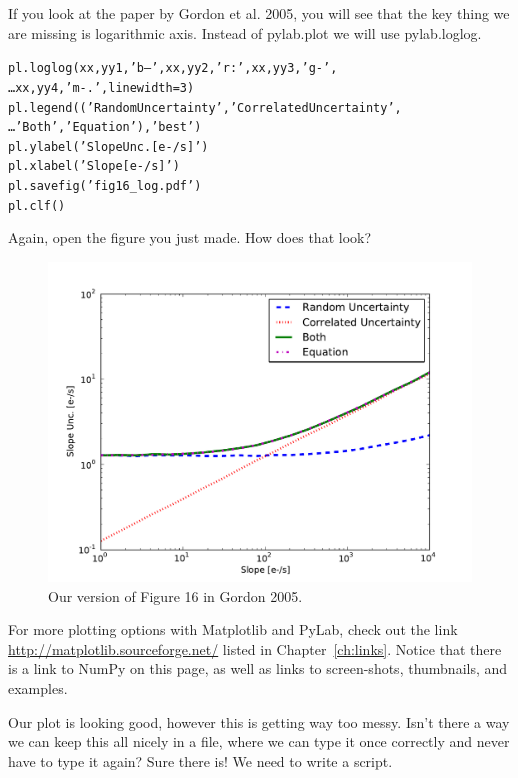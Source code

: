 If you look at the paper by
Gordon et al. 2005, you will see that the key thing we are missing is
logarithmic axis.  Instead of {\sf \small pylab.plot} we will use {\sf
\small pylab.loglog}.

\begin{alltt}
\pytab pl.loglog(xx,yy1,'b--',xx,yy2,'r:',xx,yy3,'g-',  
\ldots     xx,yy4,'m-.',linewidth=3) 
\pytab pl.legend(('Random Uncertainty','Correlated Uncertainty',  
\ldots     'Both','Equation'),'best') 
\pytab pl.ylabel('Slope Unc. [e-/s]') 
\pytab pl.xlabel('Slope [e-/s]') 
\pytab pl.savefig('fig16_log.pdf')
\pytab pl.clf()
\end{alltt}

Again, open the figure you just made.  How does that look?  

\begin{figure}[tbp]
  \centering
    \includegraphics[scale=0.6]{splot_log.pdf}
    \caption{Our version of Figure 16 in Gordon 2005.}
  \label{fig:splot}
\end{figure}

For more
plotting options with Matplotlib and PyLab, check out the link
\url{http://matplotlib.sourceforge.net/} listed in
Chapter~\ref{ch:links}.  Notice that there is a link to NumPy on this
page, as well as links to screen-shots, thumbnails, and examples.

Our plot is looking good, however this is getting way too messy.
Isn't there a way we can keep this all nicely in a file, where we can
type it once correctly and never have to type it again?  Sure there
is!  We need to write a script.
